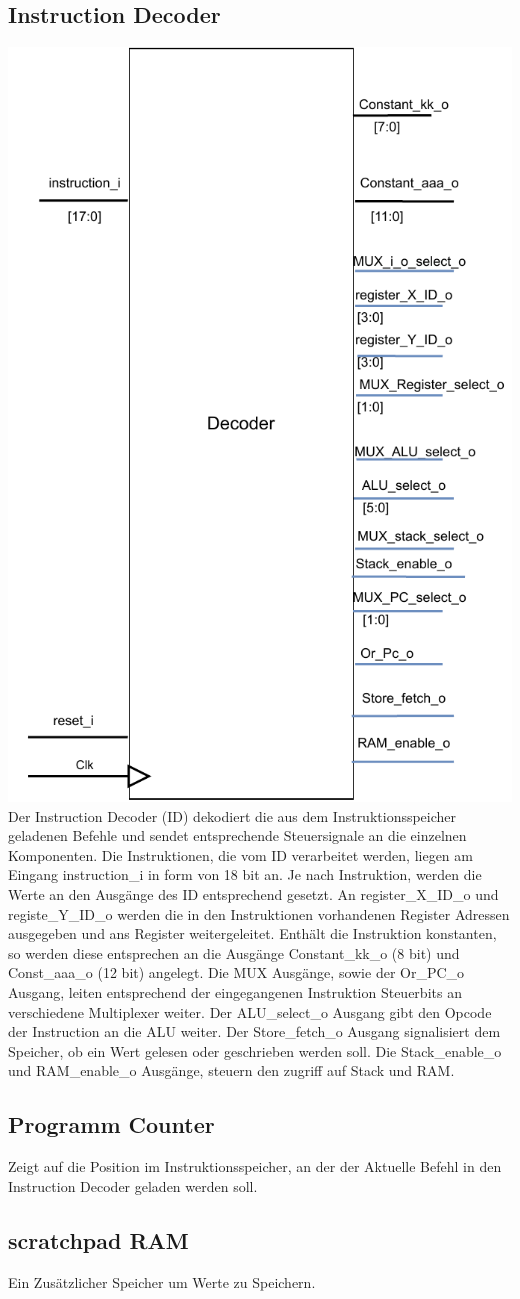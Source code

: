 \documentclass{scrartcl}
\begin{document}
\subsection{Instruction Decoder}
\includegraphics[height=0.7\textwidth, angle=0]{ID_beschreibung.pdf}\\
Der Instruction Decoder (ID) dekodiert die aus dem Instruktionsspeicher geladenen Befehle und sendet entsprechende Steuersignale an die einzelnen Komponenten. Die Instruktionen, die vom ID verarbeitet werden, liegen am Eingang instruction\_i in form von 18 bit an. Je nach Instruktion, werden die Werte an den Ausgänge des ID entsprechend gesetzt. An register\_X\_ID\_o und registe\_Y\_ID\_o werden die in den Instruktionen vorhandenen Register Adressen ausgegeben und ans Register weitergeleitet.
Enthält die Instruktion konstanten, so werden diese entsprechen an die Ausgänge Constant\_kk\_o (8 bit) und Const\_aaa\_o (12 bit) angelegt. Die MUX Ausgänge, sowie der Or\_PC\_o Ausgang, leiten entsprechend der eingegangenen Instruktion Steuerbits an verschiedene Multiplexer weiter. Der ALU\_select\_o Ausgang gibt den Opcode der Instruction an die ALU weiter. Der Store\_fetch\_o Ausgang signalisiert dem Speicher, ob ein Wert gelesen oder geschrieben werden soll. Die Stack\_enable\_o und RAM\_enable\_o Ausgänge, steuern den zugriff auf Stack und RAM.
\subsection{Programm Counter}
Zeigt auf die Position im Instruktionsspeicher, an der der Aktuelle Befehl in den Instruction Decoder geladen werden soll.
\subsection{scratchpad RAM}
Ein Zusätzlicher Speicher um Werte zu Speichern.
\end{document}

